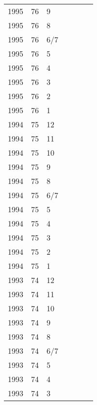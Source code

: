 \begin{longtable}{ |l|l|l|l|p{2.7cm}|l|p{2cm}| }
 1995 & 76 &     9 &         &                &  & \\
 1995 & 76 &     8 &         &                &  & \\
 1995 & 76 &   6/7 &         &                &  & \\
 1995 & 76 &     5 &         &                &  & \\
 1995 & 76 &     4 &         &                &  & \\
 1995 & 76 &     3 &         &                &  & \\
 1995 & 76 &     2 &         &                &  & \\
 1995 & 76 &     1 &         &                &  & \\
 1994 & 75 &    12 &         &                &  & \\
 1994 & 75 &    11 &         &                &  & \\
 1994 & 75 &    10 &         &                &  & \\
 1994 & 75 &     9 &         &                &  & \\
 1994 & 75 &     8 &         &                &  & \\
 1994 & 75 &   6/7 &         &                &  & \\
 1994 & 75 &     5 &         &                &   & \\
 1994 & 75 &     4 &         &                &  & \\
 1994 & 75 &     3 &         &                &  & \\
 1994 & 75 &     2 &         &                &  & \\
 1994 & 75 &     1 &         &                &  & \\
 1993 & 74 &    12 &         &                &  & \\
 1993 & 74 &    11 &         &                &  & \\
 1993 & 74 &    10 &         &                &  & \\
 1993 & 74 &     9 &         &                &  & \\
 1993 & 74 &     8 &         &                &  & \\
 1993 & 74 &   6/7 &         &                &  & \\
 1993 & 74 &     5 &         &                &  & \\
 1993 & 74 &     4 &         &                &  & \\
 1993 & 74 &     3 &         &                &  & \\

\end{longtable}
